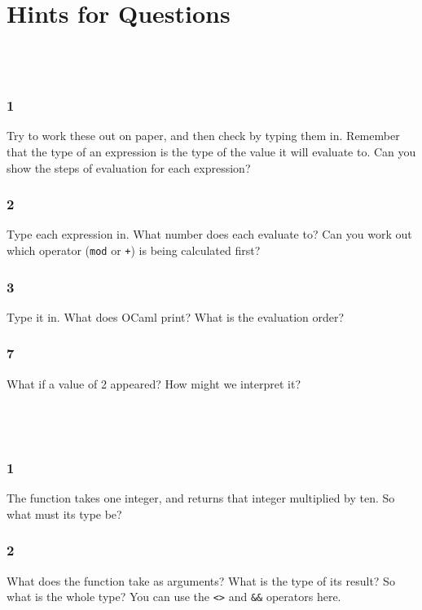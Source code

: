 \documentclass[]{book}
\begin{document}
\chapter{Hints for Questions}
\label{hints}
\begin{multicols*}{2}
\section*{\\ }
\subsection*{1}
Try to work these out on paper, and then check by typing them in. Remember that the type of an expression is the type of the value it will evaluate to. Can you show the steps of evaluation for each expression?

\subsection*{2}
Type each expression in. What number does each evaluate to? Can you work out which operator (\texttt{mod} or \texttt{+}) is being calculated first?

\subsection*{3}
Type it in. What does OCaml print? What is the evaluation order?

\subsection*{7}
What if a value of 2 appeared? How might we interpret it?

\section*{\\ }
\subsection*{1}
The function takes one integer, and returns that integer multiplied by ten. So what must its type be?
\subsection*{2}
What does the function take as arguments? What is the type of its result? So what is the whole type? You can use the \texttt{<>} and \texttt{\&\&} operators here.

\end{multicols*}
\end{document}
